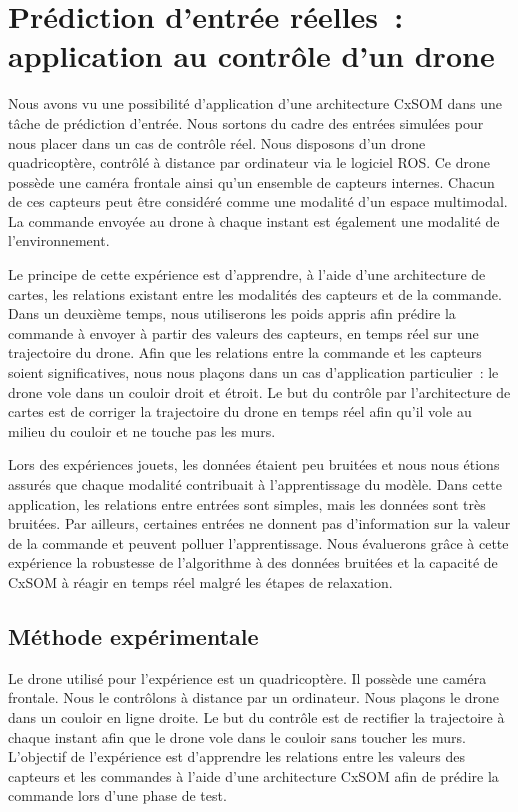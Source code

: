 \documentclass[../main]{subfiles}
\begin{document}
	
\section{Prédiction d'entrée réelles~: application au contrôle d'un drone}

Nous avons vu une possibilité d'application d'une architecture CxSOM dans une tâche de prédiction d'entrée. Nous sortons du cadre des entrées simulées pour nous placer dans un cas de contrôle réel. 
Nous disposons d'un drone quadricoptère, contrôlé à distance par ordinateur via le logiciel ROS.
Ce drone possède une caméra frontale ainsi qu'un ensemble de capteurs internes. Chacun de ces capteurs peut être considéré comme une modalité d'un espace multimodal. 
La commande envoyée au drone à chaque instant est également une modalité de l'environnement.

Le principe de cette expérience est d'apprendre, à l'aide d'une architecture de cartes, les relations existant entre les modalités des capteurs et de la commande. Dans un deuxième temps, nous utiliserons les poids appris afin prédire la commande à envoyer à partir des valeurs des capteurs, en temps réel sur une trajectoire du drone.
Afin que les relations entre la commande et les capteurs soient significatives, nous nous plaçons dans un cas d'application particulier~: le drone vole dans un couloir droit et étroit. Le but du contrôle par l'architecture de cartes est de corriger la trajectoire du drone en temps réel afin qu'il vole au milieu du couloir et ne touche pas les murs.

Lors des expériences jouets, les données étaient peu bruitées et nous nous étions assurés que chaque modalité contribuait à l'apprentissage du modèle. 
Dans cette application, les relations entre entrées sont simples, mais les données sont très bruitées. Par ailleurs, certaines entrées ne donnent pas d'information sur la valeur de la commande et peuvent polluer l'apprentissage.
Nous évaluerons grâce à cette expérience la robustesse de l'algorithme à des données bruitées et la capacité de CxSOM à réagir en temps réel malgré les étapes de relaxation.

\subsection{Méthode expérimentale}

Le drone utilisé pour l'expérience est un quadricoptère. Il possède une caméra frontale.
Nous le contrôlons à distance par un ordinateur. 
Nous plaçons le drone dans un couloir en ligne droite. Le but du contrôle est de rectifier la trajectoire à chaque instant afin que le drone vole dans le couloir sans toucher les murs. L'objectif de l'expérience est d'apprendre les relations entre les valeurs des capteurs et les commandes à l'aide d'une architecture CxSOM afin de prédire la commande lors d'une phase de test.
\end{document}
